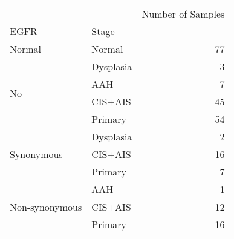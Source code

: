 \begin{tabular}{l|lr}
\toprule
               &         & Number of Samples \\
EGFR & Stage &                   \\
\midrule
Normal & Normal &                77 \\
\multirow{4}{*}{No} & Dysplasia &                 3 \\
               & AAH &                 7 \\
               & CIS+AIS &                45 \\
               & Primary &                54 \\
\cline{1-3}
\multirow{3}{*}{Synonymous} & Dysplasia &                 2 \\
               & CIS+AIS &                16 \\
               & Primary &                 7 \\
\cline{1-3}
\multirow{3}{*}{Non-synonymous} & AAH &                 1 \\
               & CIS+AIS &                12 \\
               & Primary &                16 \\
\bottomrule
\end{tabular}
